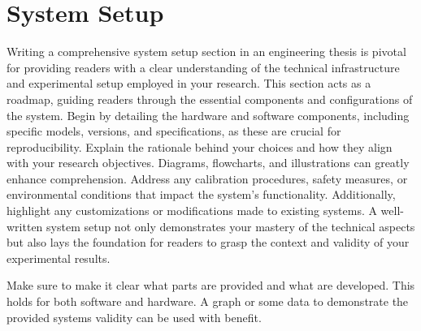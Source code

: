 \chapter{System Setup}\label{ch:system-setup}
Writing a comprehensive system setup section in an engineering thesis is pivotal for providing readers with a clear understanding of the technical infrastructure and experimental setup employed in your research. This section acts as a roadmap, guiding readers through the essential components and configurations of the system. Begin by detailing the hardware and software components, including specific models, versions, and specifications, as these are crucial for reproducibility. Explain the rationale behind your choices and how they align with your research objectives. Diagrams, flowcharts, and illustrations can greatly enhance comprehension. Address any calibration procedures, safety measures, or environmental conditions that impact the system's functionality. Additionally, highlight any customizations or modifications made to existing systems. A well-written system setup not only demonstrates your mastery of the technical aspects but also lays the foundation for readers to grasp the context and validity of your experimental results. \medskip

Make sure to make it clear what parts are provided and what are developed. This holds for both software and hardware. A graph or some data to demonstrate the provided systems validity can be used with benefit.